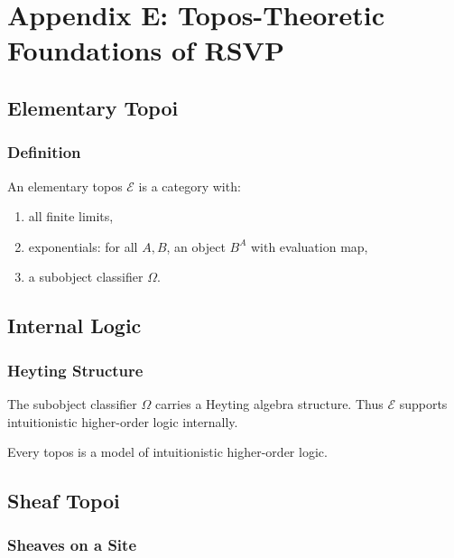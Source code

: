 \chapter*{Appendix E: Topos-Theoretic Foundations of RSVP}

\section{Elementary Topoi}

\subsection{Definition}

\begin{definition}
An elementary topos $\mathscr{E}$ is a category with:
\begin{enumerate}
\item all finite limits,
\item exponentials: for all $A,B$, an object $B^A$ with evaluation map,
\item a subobject classifier $\Omega$.
\end{enumerate}
\end{definition}

\section{Internal Logic}

\subsection{Heyting Structure}

The subobject classifier $\Omega$ carries a Heyting algebra structure.  
Thus $\mathscr{E}$ supports intuitionistic higher-order logic internally.

\begin{proposition}
Every topos is a model of intuitionistic higher-order logic.
\end{proposition}

\section{Sheaf Topoi}

\subsection{Sheaves on a Site}

